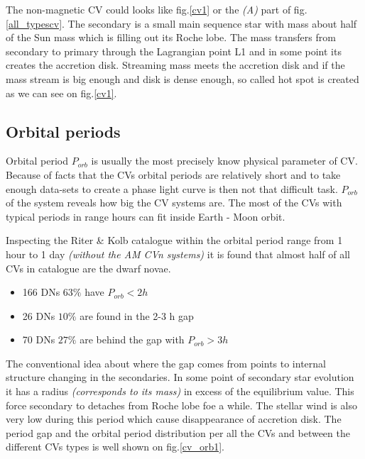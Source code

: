 \documentclass[oneside,a4paper,11pt]{report}
\begin{document}
The non-magnetic CV could looks like fig.\ref{cv1} or the \textit{(A)} part of fig.\ref{all_typescv}. The secondary is a small main sequence star with mass about 
half of the Sun mass which is filling out its Roche lobe. The mass transfers from secondary to primary
through the Lagrangian point L1 and in some point its creates the accretion disk. Streaming mass meets the accretion disk and if the mass stream is big enough and disk is dense enough, so called 
hot spot is created as we can see on fig.\ref{cv1}.  

\subsection{Orbital periods}
Orbital period $P_{orb}$ is usually the most precisely know physical parameter of CV. Because of facts that the 
CVs orbital periods are relatively short and to take enough data-sets to create a phase light curve 
is then not that difficult task. $P_{orb}$ of the system reveals how big the CV systems are. The most of the 
CVs with typical periods in range hours can fit inside Earth - Moon orbit. 

Inspecting the Riter \& Kolb catalogue \citet{2003A&A...404..301R} within the orbital period range from 1 hour to 1 day 
\textit{(without the AM CVn systems)} it is found that almost half of all CVs in catalogue are the dwarf novae.
\begin{itemize}
 \item 166 DNs $63\%$ have $P_{orb} < 2h$
 \item 26 DNs $10\%$ are found in the 2-3 h gap 
 \item 70 DNs $27\%$ are behind the gap with $P_{orb} > 3h$  
\end{itemize}
The conventional idea about where the gap comes from points to internal structure changing in the secondaries.   
In some point of secondary star evolution it has a radius \textit{(corresponds to its mass)} in excess of the equilibrium value. 
This force secondary to detaches  from Roche lobe foe a while. The stellar wind is also very low during this period which cause disappearance of accretion disk.
The period gap and the orbital period distribution per all the CVs and between the different CVs types is well shown on fig.\ref{cv_orb1}.  
\end{document}
